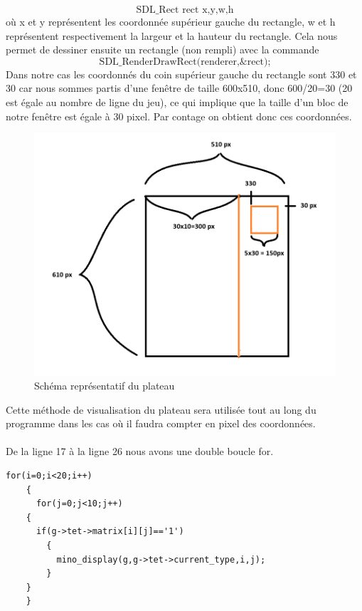 \documentclass[a4paper,10p]{report}
\begin{document}
\begin{equation*}
    \text{SDL\_Rect rect {x,y,w,h}}
\end{equation*}
où x et y représentent les coordonnée supérieur gauche du rectangle, w et h représentent respectivement la largeur et la hauteur du rectangle. Cela nous permet de dessiner ensuite un rectangle (non rempli) avec la commande 
\begin{equation*}
\text{SDL\_RenderDrawRect(renderer,\&rect);}
\end{equation*}
Dans notre cas les coordonnés du coin supérieur gauche du rectangle sont 330 et 30 car nous sommes partis d'une fenêtre de taille 600x510, donc 600/20=30 (20 est égale au nombre de ligne du jeu), ce qui implique que la taille d'un bloc de notre fenêtre est égale à 30 pixel. Par contage on obtient donc ces coordonnées.
\begin{figure}[ht]
\includegraphics[scale=0.5]{dessin_coordonnees.png}
\caption{\label{dessin6} Schéma représentatif du plateau}
\end{figure}
Cette méthode de visualisation du plateau sera utilisée tout au long du programme dans les cas où il faudra compter en pixel des coordonnées.
\\\\
De la ligne \textcolor{gris}{17} à la ligne \textcolor{gris}{26} nous avons une double boucle for.
\begin{lstlisting}
for(i=0;i<20;i++)
    {
      for(j=0;j<10;j++)
	{
	  if(g->tet->matrix[i][j]=='1')
	    {
	      mino_display(g,g->tet->current_type,i,j);
	    }
	}
    }
\end{lstlisting}
\end{document}
